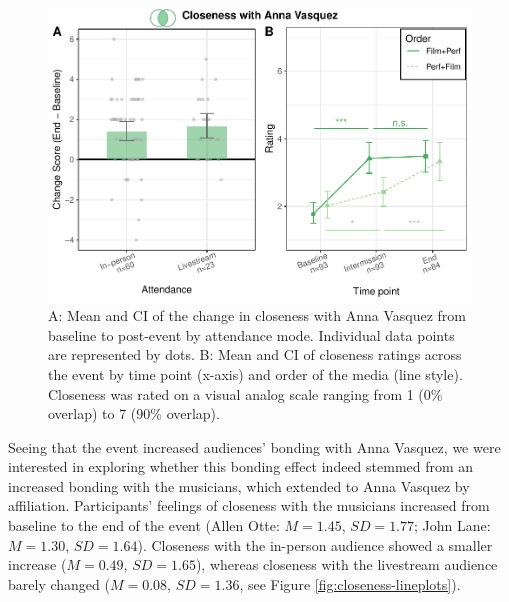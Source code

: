\documentclass[
  man,floatsintext]{apa6}
\begin{document}
\begin{figure}
\includegraphics[width=1\linewidth]{Schlichting_MSc_Thesis_files/figure-latex/closeness-plots-1} \caption{A: Mean and CI of the change in closeness with Anna Vasquez from baseline to post-event by attendance mode. Individual data points are represented by dots. B: Mean and CI of closeness ratings across the event by time point (x-axis) and order of the media (line style). Closeness was rated on a visual analog scale ranging from 1 (0\% overlap) to 7 (90\% overlap).}\label{fig:closeness-plots}
\end{figure}

Seeing that the event increased audiences' bonding with Anna Vasquez, we were interested in exploring whether this bonding effect indeed stemmed from an increased bonding with the musicians, which extended to Anna Vasquez by affiliation. Participants' feelings of closeness with the musicians increased from baseline to the end of the event (Allen Otte: \(M = 1.45\), \(SD = 1.77\); John Lane: \(M = 1.30\), \(SD = 1.64\)). Closeness with the in-person audience showed a smaller increase (\(M = 0.49\), \(SD = 1.65\)), whereas closeness with the livestream audience barely changed (\(M = 0.08\), \(SD = 1.36\), see Figure \ref{fig:closeness-lineplots}).
\end{document}
